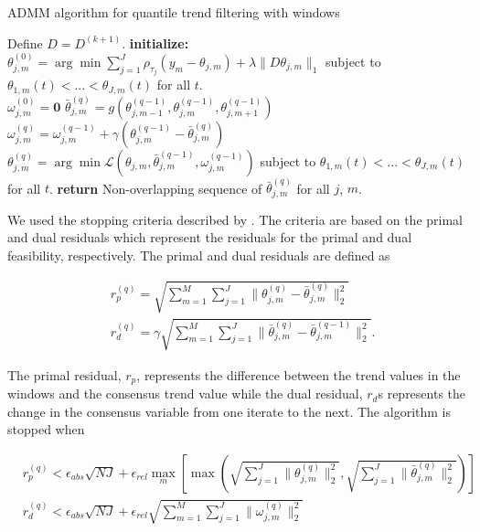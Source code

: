 \documentclass[12pt]{article}
\begin{document}
	\begin{algorithm}
		\caption{ADMM algorithm for quantile trend filtering with windows}\label{euclid}
		\begin{algorithmic}		
			\State Define $D = D^{(k+1)}$. 
			\State \textbf{initialize:} \\
				 $\theta_{j,m}^{(0)} = \arg \min \sum_{j=1}^J\rho_{\tau_j}(y_m - \theta_{j,m})+\lambda \lVert D\theta_{j,m}\rVert_1$ subject to $\theta_{1,m}(t) < ...<\theta_{J,m}(t)$ for all $t$. \\		
			 	 $\omega_{j,m}^{(0)} = \mathbf{0}$	
			\Repeat{}
			\State  		
			$\bar{\theta}_{j,m}^{(q)} = g(\theta_{j, m-1}^{(q-1)}, \theta_{j,m}^{(q-1)}, \theta_{j,m+1}^{(q-1)})$
			\State 
			$\omega_{j,m}^{(q)} = \omega_{j,m}^{(q-1)} + \gamma(\theta_{j,m}^{(q-1)} - \bar{\theta}_{j,m}^{(q)})$	
			\State
				$\theta_{j,m}^{(q)} = \arg\min \mathcal{L}(\theta_{j,m}, \bar{\theta}_{j,m}^{(q-1)}, \omega_{j,m}^{(q-1)})$			
			 subject to $\theta_{1,m}(t) < ...<\theta_{J,m}(t)$ for all $t$.
			\State \textbf{return} Non-overlapping sequence of $\bar{\theta}_{j,m}^{(q)}$ for all $j$, $m$.
			
		\end{algorithmic}
	\end{algorithm}

	We used the stopping criteria described by \cite{boyd2011distributed}. The criteria are based on the primal and dual residuals which represent the residuals for the primal and dual feasibility, respectively. The primal and dual residuals are defined as 
	
	\begin{align}
	&r_p^{(q)} = \sqrt{\sum_{m=1}^M\sum_{j=1}^J\lVert\theta_{j,m}^{(q)} - \bar{\theta}_{j,m}^{(q)}\rVert_2^2}\\
	&r_d^{(q)} = \gamma\sqrt{\sum_{m=1}^M \sum_{j=1}^J\lVert\bar{\theta}_{j,m}^{(q)} - \bar{\theta}_{j,m}^{(q-1)}\rVert_2^2}.
	\end{align}
	
	The primal residual, $r_p$, represents the difference between the trend values in the windows and the consensus trend value while the dual residual, $r_d$s represents the change in the consensus variable from one iterate to the next. The algorithm is stopped when 
	
	\begin{align}
		&r_p^{(q)} < \epsilon_{abs}\sqrt{NJ} + \epsilon_{rel}\underset{m}{\max}\left[\max 
		\left(\sqrt{\sum_{j=1}^J \lVert\theta_{j,m}^{(q)}\rVert_2^2}, \sqrt{\sum_{j=1}^J \lVert \bar{\theta}_{j,m}^{(q)} \rVert_2^2} \right )\right]\\
		&r_d^{(q)} < \epsilon_{abs}\sqrt{NJ} + \epsilon_{rel}\sqrt{\sum_{m=1}^M\sum_{j=1}^J\lVert \omega_{j,m}^{(q)}\rVert_2^2}
	\end{align}
	
\end{document}
